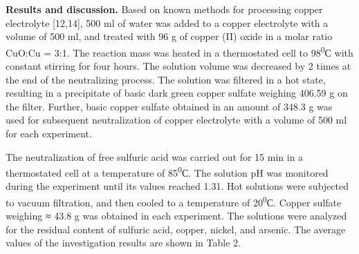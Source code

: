 
{\bfseries Results and discussion.} Based on known methods for processing
copper electrolyte {[}12,14{]}, 500 ml of water was added to a copper
electrolyte with a volume of 500 ml, and treated with 96 g of copper
(II) oxide in a molar ratio CuO:Cu = 3:1. The reaction mass was heated
in a thermostated cell to 98\textsuperscript{0}С with constant stirring
for four hours. The solution volume was decreased by 2 times at the end
of the neutralizing process. The solution was filtered in a hot state,
resulting in a precipitate of basic dark green copper sulfate weighing
406.59 g on the filter. Further, basic copper sulfate obtained in an
amount of 348.3 g was used for subsequent neutralization of copper
electrolyte with a volume of 500 ml for each experiment.

The neutralization of free sulfuric acid was carried out for 15 min in a
thermostated cell at a temperature of 85\textsuperscript{0}С. The
solution pH was monitored during the experiment until its values reached
1.31. Hot solutions were subjected to vacuum filtration, and then cooled
to a temperature of 20\textsuperscript{0}С. Copper sulfate weighing ≈
43.8 g was obtained in each experiment. The solutions were analyzed for
the residual content of sulfuric acid, copper, nickel, and arsenic. The
average values of the investigation results are shown in Table 2.

